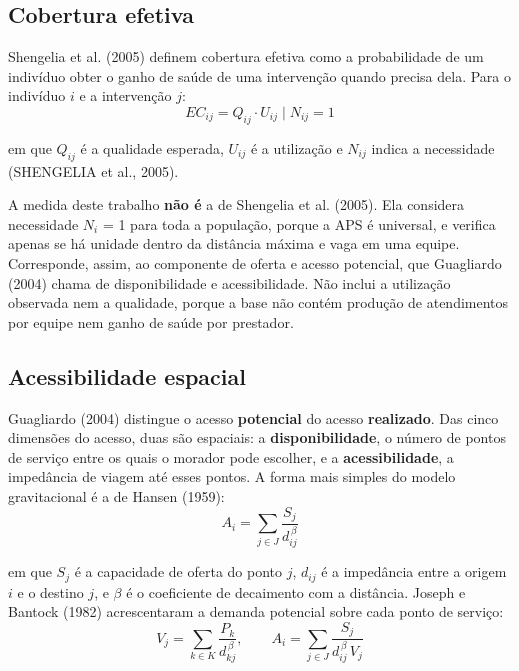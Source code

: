 \documentclass[11pt,a4paper]{article}
\begin{document}
\subsection{Cobertura efetiva}\label{sec:2.2}

Shengelia et al. (2005) definem cobertura efetiva como a probabilidade de um indivíduo obter o ganho de saúde de uma intervenção quando precisa dela. Para o indivíduo $i$ e a intervenção $j$:
\begin{equation}
\mathit{EC}_{ij} = Q_{ij} \cdot U_{ij} \mid N_{ij} = 1
\end{equation}

\noindent em que $Q_{ij}$ é a qualidade esperada, $U_{ij}$ é a utilização e $N_{ij}$ indica a necessidade (SHENGELIA et al., 2005).

A medida deste trabalho \textbf{não é} a de Shengelia et al. (2005). Ela considera necessidade $N_{i}$ = 1 para toda a população, porque a APS é universal, e verifica apenas se há unidade dentro da distância máxima e vaga em uma equipe. Corresponde, assim, ao componente de oferta e acesso potencial, que Guagliardo (2004) chama de disponibilidade e acessibilidade. Não inclui a utilização observada nem a qualidade, porque a base não contém produção de atendimentos por equipe nem ganho de saúde por prestador.

\subsection{Acessibilidade espacial}\label{sec:2.3}

Guagliardo (2004) distingue o acesso \textbf{potencial} do acesso \textbf{realizado}. Das cinco dimensões do acesso, duas são espaciais: a \textbf{disponibilidade}, o número de pontos de serviço entre os quais o morador pode escolher, e a \textbf{acessibilidade}, a impedância de viagem até esses pontos. A forma mais simples do modelo gravitacional é a de Hansen (1959):
\begin{equation}
A_i = \sum_{j \in J} \frac{S_j}{d_{ij}^{\,\beta}}
\end{equation}

\noindent em que $S_{j}$ é a capacidade de oferta do ponto $j$, $d_{ij}$ é a impedância entre a origem $i$ e o destino $j$, e $\beta $ é o coeficiente de decaimento com a distância. Joseph e Bantock (1982) acrescentaram a demanda potencial sobre cada ponto de serviço:
\begin{equation}
V_j = \sum_{k \in K} \frac{P_k}{d_{kj}^{\,\beta}}, \qquad A_i = \sum_{j \in J} \frac{S_j}{d_{ij}^{\,\beta}\, V_j}
\end{equation}
\end{document}
